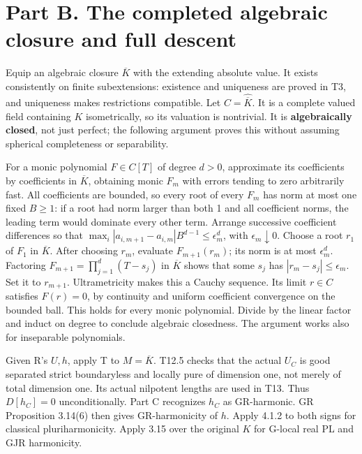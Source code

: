 \documentclass[
  10pt,
]{article}
\begin{document}
\section{Part B. The completed algebraic closure and full
descent}\label{part-b.-the-completed-algebraic-closure-and-full-descent}

Equip an algebraic closure \(\overline K\) with the extending absolute
value. It exists consistently on finite subextensions: existence and
uniqueness are proved in T3, and uniqueness makes restrictions
compatible. Let \(C=\widehat{\overline K}\). It is a complete valued
field containing \(K\) isometrically, so its valuation is nontrivial. It
is \textbf{algebraically closed}, not just perfect; the following
argument proves this without assuming spherical completeness or
separability.

For a monic polynomial \(F\in C[T]\) of degree \(d>0\), approximate its
coefficients by coefficients in \(\overline K\), obtaining monic \(F_m\)
with errors tending to zero arbitrarily fast. All coefficients are
bounded, so every root of every \(F_m\) has norm at most one fixed
\(B\geq1\): if a root had norm larger than both 1 and all coefficient
norms, the leading term would dominate every other term. Arrange
successive coefficient differences so that
\(\max_i|a_{i,m+1}-a_{i,m}|B^{d-1}\leq\epsilon_m^d\), with
\(\epsilon_m\downarrow0\). Choose a root \(r_1\) of \(F_1\) in
\(\overline K\). After choosing \(r_m\), evaluate \(F_{m+1}(r_m)\); its
norm is at most \(\epsilon_m^d\). Factoring
\(F_{m+1}=\prod_{j=1}^d(T-s_j)\) in \(\overline K\) shows that some
\(s_j\) has \(|r_m-s_j|\leq\epsilon_m\). Set it to \(r_{m+1}\).
Ultrametricity makes this a Cauchy sequence. Its limit \(r\in C\)
satisfies \(F(r)=0\), by continuity and uniform coefficient convergence
on the bounded ball. This holds for every monic polynomial. Divide by
the linear factor and induct on degree to conclude algebraic closedness.
The argument works also for inseparable polynomials.

Given R's \(U,h\), apply T to \(M=\overline K\). T12.5 checks that the
actual \(U_C\) is good separated strict boundaryless and locally pure of
dimension one, not merely of total dimension one. Its actual nilpotent
lengths are used in T13. Thus \(D[h_C]=0\) unconditionally. Part C
recognizes \(h_C\) as GR-harmonic. GR Proposition 3.14(6) then gives
GR-harmonicity of \(h\). Apply 4.1.2 to both signs for classical
pluriharmonicity. Apply 3.15 over the original \(K\) for G-local real PL
and GJR harmonicity.
\end{document}

